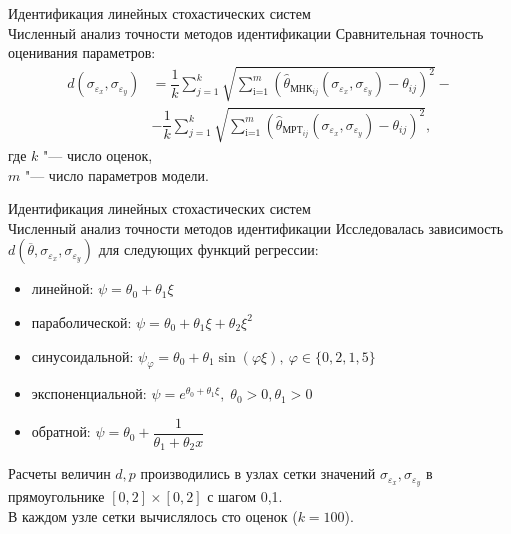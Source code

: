 \documentclass[hyperref={pdftex,unicode}]{beamer}
\begin{document}
\begin{frame}{%
    Идентификация линейных стохастических систем \\
    \small{Численный анализ точности методов идентификации}
  }
  Сравнительная точность оценивания параметров:
  \small{
    \begin{equation*}
      \begin{split}
        d(\sigma_{\varepsilon_x}, \sigma_{\varepsilon_y}) &=
        \dfrac{1}{k} \sum_{j=1}^k
        \sqrt{\sum_{\text{i=1}}^m (\hat{\theta}_{\text{МНК}_{ij}}(\sigma_{\varepsilon_x}, \sigma_{\varepsilon_y}) - \theta_{ij})^2} - \\
        &- \dfrac{1}{k} \sum_{j=1}^k
        \sqrt{\sum_{\text{i=1}}^m (\hat{\theta}_{\text{МРТ}_{ij}}(\sigma_{\varepsilon_x}, \sigma_{\varepsilon_y}) - \theta_{ij})^2},
      \end{split}
    \end{equation*}
  }
  где \( k \) "--- число оценок, \\
  \hspace*{6.5mm}\( m \) "--- число параметров модели.
\end{frame}

\begin{frame}{%
    Идентификация линейных стохастических систем \\
    \small{Численный анализ точности методов идентификации}
  }
  Исследовалась зависимость
  \( d(\overline{\theta}, \sigma_{\varepsilon_x}, \sigma_{\varepsilon_y}) \) для следующих функций регрессии:
  \begin{itemize}
  \item линейной:
    \( \psi = \theta_0 + \theta_1 \xi \)
  \item параболической:
    \( \psi = \theta_0 + \theta_1 \xi + \theta_2 \xi^2 \)
  \item синусоидальной:
    \( \psi_{\varphi} = \theta_0 + \theta_1 \sin{(\varphi \xi)}, \:
    \varphi \in \{ 0{,}2, 1, 5 \} \)
  \item экспоненциальной:
    \( \psi = e^{\theta_0 + \theta_1 \xi}, \; \theta_0 > 0, \theta_1 > 0 \)
  \item обратной:
    \( \psi = \theta_0 + \dfrac{1}{\theta_1 + \theta_2 x} \)
  \end{itemize}

\bigskip
\scriptsize{%
  Расчеты величин \( d, p \) производились в узлах сетки значений
  \( \sigma_{\varepsilon_x}, \sigma_{\varepsilon_y} \) в прямоугольнике
  \( [0, 2] \times [0, 2] \) с шагом 0{,}1. \\
  В каждом узле сетки вычислялось сто оценок (\( k = 100 \)).
}
\end{frame}
\end{document}
